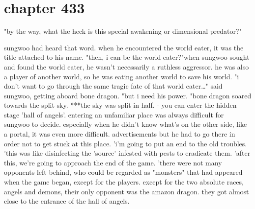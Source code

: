 \section{chapter 433}

"by the way, what the heck is this special awakening or dimensional predator?"




sungwoo had heard that word.
 when he encountered the world eater, it was the title attached to his name.
"then, i can be the world eater?"when sungwoo sought and found the world eater, he wasn't necessarily a ruthless aggressor.
 he was also a player of another world, so he was eating another world to save his world.
"i don't want to go through the same tragic fate of that world eater…" said sungwoo, getting aboard bone dragon.
 "but i need his power.
"bone dragon soared towards the split sky.
***the sky was split in half.
- you can enter the hidden stage 'hall of angels'.
entering an unfamiliar place was always difficult for sungwoo to decide.
 especially when he didn't know what's on the other side, like a portal, it was even more difficult.
 advertisements    but he had to go there in order not to get stuck at this place.
 'i'm going to put an end to the old troubles.
'this was like disinfecting the 'source' infested with pests to eradicate them.
'after this, we're going to approach the end of the game.
'there were not many opponents left behind, who could be regarded as "monsters" that had appeared when the game began, except for the players.
except for the two absolute races, angels and demons, their only opponent was the amazon dragon.
they got almost close to the entrance of the hall of angels.
 
